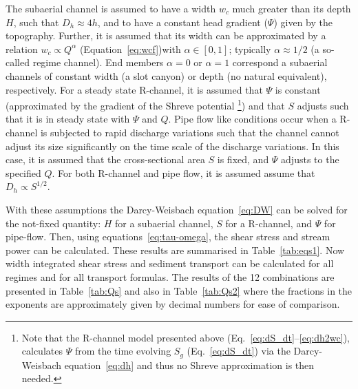 \documentclass[draft]{agujournal2019}
\begin{document}
The  subaerial channel is assumed to have a width $w_c$ much greater than its depth $H$, such that $D_h\approx 4h$, and to have a constant head gradient ($\Psi$) given by the topography.
Further, it is  assumed that its width can be approximated by a relation $w_c \propto Q^\alpha$ (Equation~\ref{eq:wcf})with $\alpha\in [0,1]$; typically $\alpha \approx 1/2$ (a so-called regime channel).
End members $\alpha=0$ or $\alpha=1$ correspond a  subaerial channels of constant width (a slot canyon) or depth (no natural equivalent), respectively.
%
For a steady state R-channel, it is assumed that  $\Psi$ is constant (approximated by the gradient of the Shreve \citeyear{shreve1972} potential \footnote{Note that the R-channel model presented above (Eq.~\eqref{eq:dS_dt}--\eqref{eq:dh2wc}), calculates $\Psi$ from the time evolving $S_g$ (Eq.~\eqref{eq:dS_dt}) via the Darcy-Weisbach equation~\eqref{eq:dh} and thus no Shreve approximation is then needed.}) and that $S$ adjusts such that it is in steady state with $\Psi$ and $Q$.
%
Pipe flow like conditions occur when a R-channel is subjected to rapid discharge variations such that the channel cannot adjust its size significantly on the time scale of the discharge variations.
In this case, it is assumed that the cross-sectional area $S$ is fixed, and $\Psi$ adjusts to the specified $Q$.
For both R-channel and pipe flow, it is assumed assume that $D_h \propto S^{1/2}$.

With these assumptions the Darcy-Weisbach equation~\eqref{eq:DW} can be solved for the not-fixed quantity: $H$ for a  subaerial channel, $S$ for a R-channel, and $\Psi$ for pipe-flow.
Then, using equations~\eqref{eq:tau-omega}, the shear stress and stream power can be calculated.
These results are summarised in Table~\ref{tab:eqs1}.
Now width integrated shear stress and sediment transport can be calculated for all regimes and for all transport formulas.  The results of the 12 combinations are presented in Table~\ref{tab:Qs} and also in Table~\ref{tab:Qs2} where the fractions in the exponents are approximately given by decimal numbers for ease of comparison.
\end{document}
